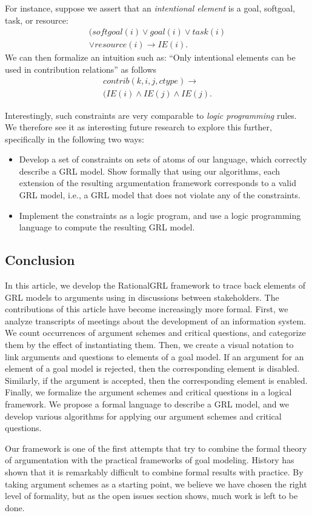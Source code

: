 For instance, suppose we assert that an \emph{intentional element} is a goal, softgoal, task, or resource: \begin{align*}
(softgoal(i)\vee goal(i)\vee task(i)\\
\vee resource(i)\rightarrow IE(i).
\end{align*}
We can then formalize an intuition such as: ``Only intentional elements can be used in contribution relations'' as follows
\begin{align*}
contrib(k,i,j,ctype)\rightarrow \\
(IE(i)\wedge IE(j)\wedge IE(j).
\end{align*}

Interestingly, such constraints are very comparable to \emph{logic programming} rules. We therefore see it as interesting future research to explore this further, specifically in the following two ways:
\begin{itemize}
\item Develop a set of constraints on sets of atoms of our language, which correctly describe a GRL model. Show formally that using our algorithms, each extension of the resulting argumentation framework corresponds to a valid GRL model, i.e., a GRL model that does not violate any of the constraints.
\item Implement the constraints as a logic program, and use a logic programming language to compute the resulting GRL model.
\end{itemize}


\subsection{Conclusion}

In this article, we develop the RationalGRL framework to trace back elements of GRL models to arguments using in discussions between stakeholders. The contributions of this article have become increasingly more formal. First, we analyze transcripts of meetings about the development of an information system. We count occurrences of argument schemes and critical questions, and categorize them by the effect of instantiating them. Then, we create a visual notation to link arguments and questions to elements of a goal model. If an argument for an element of a goal model is rejected, then the corresponding element is disabled. Similarly, if the argument is accepted, then the corresponding element is enabled. Finally, we formalize the argument schemes and critical questions in a logical framework. We propose a formal language to describe a GRL model, and we develop various algorithms for applying our argument schemes and critical questions. 

Our framework is one of the first attempts that try to combine the formal theory of argumentation with the practical frameworks of goal modeling. History has shown that it is remarkably difficult to combine formal results with practice. By taking argument schemes as a starting point, we believe we have chosen the right level of formality, but as the open issues section shows, much work is left to be done. 